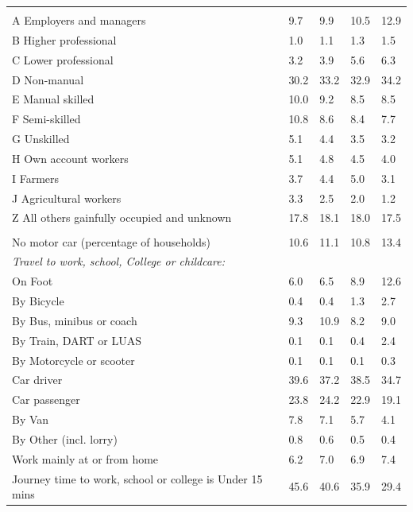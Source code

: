 \documentclass{article}
\begin{document}
\begin{table}[h]
\begin{tabular}{KTTTT}
\hline
    \\ 
    \hline
A Employers and managers &  9.7&  9.9& 10.5& 12.9\\
B Higher professional & 1.0& 1.1& 1.3& 1.5\\
C Lower professional & 3.2& 3.9& 5.6& 6.3\\
D Non-manual & 30.2& 33.2& 32.9& 34.2\\
E Manual skilled & 10.0&  9.2&  8.5&  8.5\\
F Semi-skilled & 10.8&  8.6&  8.4&  7.7\\
G Unskilled & 5.1& 4.4& 3.5& 3.2\\
H Own account workers & 5.1& 4.8& 4.5& 4.0\\
I Farmers & 3.7& 4.4& 5.0& 3.1\\
J Agricultural workers & 3.3& 2.5& 2.0& 1.2\\
Z All others gainfully occupied and unknown & 17.8& 18.1& 18.0& 17.5\\
\hline
{}\hline
    \\ 
    \hline
No motor car (percentage of households) & 10.6& 11.1& 10.8& 
13.4\\
    \hline 
\emph{Travel to work, school, College or childcare:} & & & \\
\quad On Foot &  6.0&  6.5&  8.9& 12.6\\ 
\quad By Bicycle & 0.4& 0.4& 1.3& 2.7\\ 
\quad By Bus, minibus or coach &  9.3& 10.9&  8.2&  9.0\\
\quad By Train, DART or LUAS & 0.1& 0.1& 0.4& 2.4\\
\quad By Motorcycle or scooter & 0.1& 0.1& 0.1& 0.3\\
\quad Car driver & 39.6 & 37.2& 38.5& 34.7\\
\quad Car passenger & 23.8& 24.2& 22.9& 19.1\\
\quad By Van & 7.8& 7.1& 5.7& 4.1\\
\quad By Other (incl. lorry) & 0.8& 0.6& 0.5& 0.4\\
    \hline
Work mainly at or from home & 6.2& 7.0& 6.9& 7.4\\
Journey time to work, school or college is Under 15 mins & 45.6& 40.6& 35.9& 29.4\\

\end{tabular}
\end{table}
\end{document}
